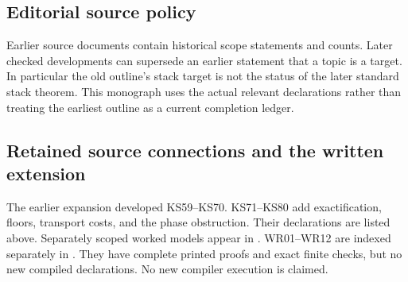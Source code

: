 \subsection*{Editorial source policy}
Earlier source documents contain historical scope statements and counts. Later checked developments can supersede an earlier statement that a topic is a target. In particular the old outline's stack target is not the status of the later standard stack theorem. This monograph uses the actual relevant declarations rather than treating the earliest outline as a current completion ledger.



\subsection*{Retained source connections and the written extension}
The earlier expansion developed KS59--KS70. KS71--KS80 add exactification, floors, transport costs, and the phase obstruction. Their declarations are listed above. Separately scoped worked models appear in . WR01--WR12 are indexed separately in . They have complete printed proofs and exact finite checks, but no new compiled declarations. No new compiler execution is claimed.
